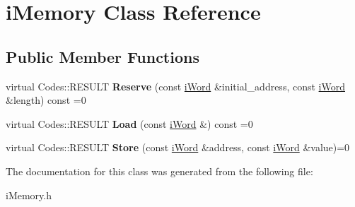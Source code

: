 \hypertarget{classiMemory}{
\section{iMemory Class Reference}
\label{classiMemory}
}
\subsection*{Public Member Functions}
\begin{DoxyCompactItemize}
\item 
\hypertarget{classiMemory_ab1bd28c9b68295959b6d5ce02c1727b5}{
virtual Codes::RESULT {\bfseries Reserve} (const \hyperlink{classiWord}{iWord} \&initial\_\-address, const \hyperlink{classiWord}{iWord} \&length) const =0}
\label{classiMemory_ab1bd28c9b68295959b6d5ce02c1727b5}

\item 
\hypertarget{classiMemory_a133a01c153be47bb6971939353f650ef}{
virtual Codes::RESULT {\bfseries Load} (const \hyperlink{classiWord}{iWord} \&) const =0}
\label{classiMemory_a133a01c153be47bb6971939353f650ef}

\item 
\hypertarget{classiMemory_ac7bce54c811d4282fa743729db04dbb2}{
virtual Codes::RESULT {\bfseries Store} (const \hyperlink{classiWord}{iWord} \&address, const \hyperlink{classiWord}{iWord} \&value)=0}
\label{classiMemory_ac7bce54c811d4282fa743729db04dbb2}

\end{DoxyCompactItemize}


The documentation for this class was generated from the following file:\begin{DoxyCompactItemize}
\item 
iMemory.h\end{DoxyCompactItemize}
